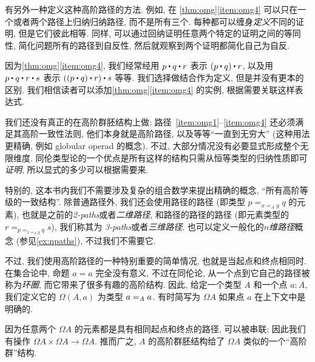 \begin{rmk}
    有另外一种定义这种高阶路径的方法.
    例如, 在 \cref{thm:omg}\ref{item:omg4} 可以只在一个或者两个路径上归纳归纳路径, 而不是所有三个.
    每种都可以缠身\emph{定义}不同的证明, 但是它们彼此相等.
    同样, 可以通过回纳证明任意两个特定的证明之间的等同性, 简化问题所有的路径到自反性, 然后就观察到两个证明都简化自己为自反.
\end{rmk}

因为\cref{thm:omg}\ref{item:omg4}, 我们经常经用 $p\ct q\ct r$ 表示 $(p\ct q)\ct r$, 以及用 $p\ct q\ct r \ct s$ 表示 $((p\ct q)\ct r)\ct s$ 等等.
我们选择做结合作为定义, 但是并没有更本的区别.
我们相信读者可以添加\cref{thm:omg}\ref{item:omg4} 的实例, 根据需要关联这样表达式.

我们还没有真正的在高阶群胚结构上做: 路径~\ref{item:omg1}--\ref{item:omg4} 还必须满足其高阶一致性法则, 他们本身就是高阶路径, %
%
%
%
以及等等``一直到无穷大'' (这种用法更精确, 例如 globular operad 的概念).
不过, 大部分情况没有必要显式形成整个无限维度.
同伦类型论的一个优点是所有这样的结构只需从恒等类型的归纳性质即可\emph{证明}, 所以显式的多少可以根据需要来.

特别的, 这本书内我们不需要涉及复杂的组合数学来提出精确的概念, ``所有高阶等级的一致结构''.
除普通路径外, 我们还会使用路径的路径 (即类型 $p =_{x=_A y} q$ 的元素), 也就是之前的\emph{2-paths}或者\emph{二维路径}, 和路径的路径的路径 (即元素类型的 $r = _{p =_{x=_A y} q} s$), 我们称其为 \emph{3-paths}或者\emph{三维路径}.
也可以定义一般化的\emph{$n$维路径}概念%
%
%
%
(参见\cref{ex:npaths}), 不过我们不需要它.

不过, 我们使用高阶路径的一种特别重要的简单情况, 也就是当起点和终点相同时.
在集合论中, 命题 $a=a$ 完全没有意义, 不过在同伦论, 从一个点到它自己的路径被称为\emph{环圈}, 而它带来了很多有趣的高阶结构.
因此, 给定一个类型 $A$ 和一个点 $a:A$, 我们定义它的 %
$\Omega(A,a)$ 为类型 $\id[A]{a}{a}$. 有时简写为 $\Omega A$ 如果点 $a$ 在上下文中是明确的.

因为任意两个 $\Omega A$ 的元素都是具有相同起点和终点的路径, 可以被串联;
因此我们有操作 $\Omega A\times \Omega A\to \Omega A$. 推而广之, $A$ 的高阶群胚结构给了 $\Omega A$ 类似的一个``高阶群''结构.

